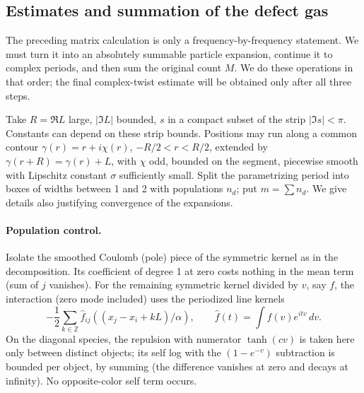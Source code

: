 \subsection{Estimates and summation of the defect gas}\label{c01-c1-estimates-and-summation-of-the-defect-gas}

The preceding matrix calculation is only a frequency-by-frequency statement. We must turn it into an absolutely summable particle expansion, continue it to complex periods, and then sum the original count \(M\). We do these operations in that order; the final complex-twist estimate will be obtained only after all three steps.

Take \(R=\Re L\) large, \(|\Im L|\) bounded, \(s\) in a compact subset of the strip \(|\Im s|<\pi\). Constants can depend on these strip bounds. Positions may run along a common contour \(\gamma(r)=r+i\chi(r)\), \(-R/2<r<R/2\), extended by \(\gamma(r+R)=\gamma(r)+L\), with \(\chi\) odd, bounded on the segment, piecewise smooth with Lipschitz constant \(\sigma\) sufficiently small. Split the parametrizing period into boxes of widths between 1 and 2 with populations \(n_d\); put \(m=\sum n_d\). We give details also justifying convergence of the expansions.

\paragraph{Population control.}
Isolate the smoothed Coulomb (pole) piece of the symmetric kernel as in the decomposition. Its coefficient of degree 1 at zero costs nothing in the mean term (sum of \(j\) vanishes). For the remaining symmetric kernel divided by \(v\), say \(f\), the interaction (zero mode included) uses the periodized line kernels
\[
 -\frac12\sum_{k\in\mathbb Z}\widehat f_{ij}((x_j-x_i+kL)/\alpha),\qquad
 \widehat f(t)=\int f(v)e^{itv}\,dv .
\]
On the diagonal species, the repulsion with numerator \(\tanh(cv)\) is taken here only between distinct objects; its self log with the \((1-e^{-v})\) subtraction is bounded per object, by summing (the difference vanishes at zero and decays at infinity). No opposite-color self term occurs.

